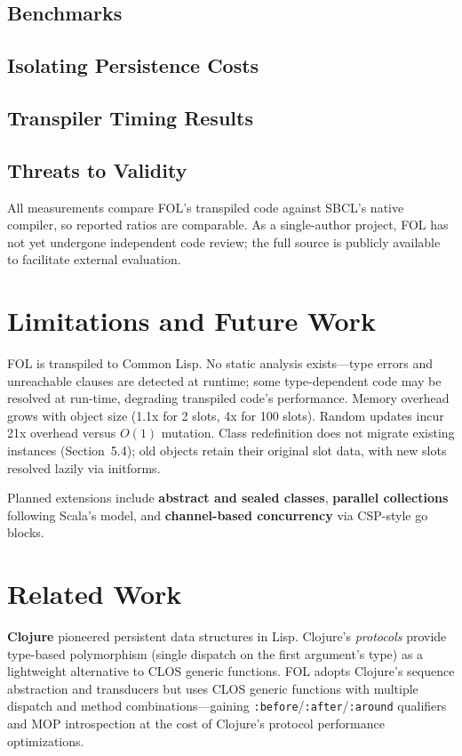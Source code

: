\documentclass[sigconf,nonacm,review]{acmart}
\begin{document}
\subsection{Benchmarks}

\subsection{Isolating Persistence Costs}

\subsection{Transpiler Timing Results}

\subsection{Threats to Validity}

All measurements  compare FOL's transpiled code against SBCL's native compiler, so reported ratios are comparable. As a single-author project, FOL has not yet
undergone independent code review; the full source is publicly available to facilitate external evaluation.

\section{Limitations and Future Work}

FOL is transpiled to Common Lisp. No static analysis exists---type errors and unreachable clauses are detected at runtime; some type-dependent code may be resolved at run-time, degrading transpiled code's performance.
Memory overhead
grows with object size (1.1x for 2 slots, 4x for 100 slots). Random updates incur 21x overhead versus $O(1)$ mutation. Class redefinition does not migrate existing instances (Section~5.4); old objects retain their original slot
data, with new slots resolved lazily via initforms.

Planned extensions include \textbf{abstract and sealed classes}, \textbf{parallel collections} following Scala's model, and \textbf{channel-based concurrency} via CSP-style go blocks.

\section{Related Work}

\textbf{Clojure} \cite{Hickey2008} pioneered persistent data structures in Lisp. Clojure's \textit{protocols} provide type-based polymorphism (single dispatch on the first argument's type) as a lightweight alternative to
CLOS generic functions. FOL adopts Clojure's sequence abstraction and transducers but uses CLOS generic functions with multiple dispatch and method combinations---gaining \texttt{:before}/\texttt{:after}/\texttt{:around}
qualifiers and MOP introspection at the cost of Clojure's protocol performance optimizations.
\end{document}
